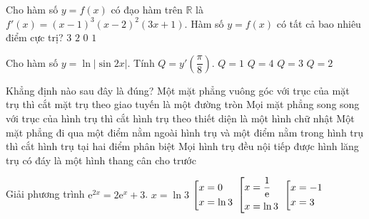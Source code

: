 \begin{ex}%
	Cho hàm số $y=f(x)$ có đạo hàm trên $\mathbb{R}$ là $f'(x)=(x-1)^3(x-2)^2(3x+1)$. Hàm số $y=f(x)$ có tất cả bao nhiêu điểm cực trị?
	\choice
	{$3$}
	{\True $2$}
	{$0$}
	{$1$}
\end{ex}

\begin{ex}%
	Cho hàm số $y=\ln|\sin2x|$. Tính $Q=y'\left(\dfrac{\pi}{8}\right)$.
	\choice
	{$Q=1$}
	{$Q=4$}
	{$Q=3$}
	{\True $Q=2$}
\end{ex}

\begin{ex}%
	Khẳng định nào sau đây là đúng?
	\choice
	{\True Một mặt phẳng vuông góc với trục của mặt trụ thì cắt mặt trụ theo giao tuyến là một đường tròn}
	{Mọi mặt phẳng song song với trục của hình trụ thì cắt hình trụ theo thiết diện là một hình chữ nhật}
	{Một mặt phẳng đi qua một điểm nằm ngoài hình trụ và một điểm nằm trong hình trụ thì cắt hình trụ tại hai điểm phân biệt}
	{Mọi hình trụ đều nội tiếp được hình lăng trụ có đáy là một hình thang cân cho trước}
	\loigiai{
		
	}
\end{ex}

\begin{ex}%
	Giải phương trình $\mathrm{e}^{2x}=2\mathrm{e}^x+3$.
	\choice
	{\True $x=\ln3$}
	{$\left[\begin{aligned}x&=0\\x&=\ln3\end{aligned}\right.$}
	{$\left[\begin{aligned}x&=\dfrac{1}{\mathrm{e}}\\x&=\ln3\end{aligned}\right.$}
	{$\left[\begin{aligned}x&=-1\\x&=3\end{aligned}\right.$}
\end{ex}

